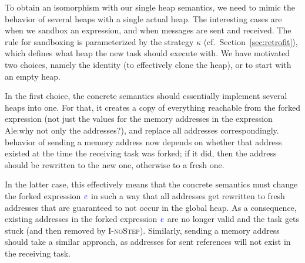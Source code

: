 \documentclass{sigplanconf}
\newcommand{\Varid}[1]{\mathit{#1}}
\newcommand{\Red}[1]{{\color{red} #1}}
\begin{document}
To obtain an isomorphism with our single heap semantics, we need to mimic the
behavior of several heaps with a single actual heap.
The interesting cases are when we sandbox
an expression, and when messages are sent and received.
The rule for sandboxing is
parameterized by the strategy \ensuremath{\kappa} (cf.\ Section~\ref{sec:retrofit}),
which defines what heap the new task
should execute with.  We have motivated two choices, namely the identity (to
effectively clone the heap), or to start with an empty heap.  

{\color{red}
In the first choice, the concrete semantics should essentially implement several
heaps into one. For that, it creates a copy of everything reachable from the
forked expression (not just the values for the memory addresses in the
expression \Red{Ale:why not only the addresses?}), and replace all addresses
correspondingly.  behavior of sending a memory address now depends on whether
that address existed at the time the receiving task was forked; if it did, then
the address should be rewritten to the new one, otherwise to a fresh one.


In the latter case, this effectively means that the concrete semantics must
change the forked expression \ensuremath{\ifc{\Varid{e}}} in such a way that all addresses get rewritten
to fresh addresses that are guaranteed to not occur in the global heap. As a
consequence, existing addresses in the forked expression \ensuremath{\ifc{\Varid{e}}} are no longer
valid and the task gets stuck (and then removed by \textsc{I-noStep}).
Similarly, sending a memory address should take a similar approach, as addresses
for sent references will not exist in the receiving task.
}
\end{document}
